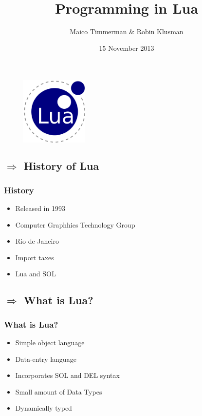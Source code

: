 \documentclass{beamer}
\begin{document}
\title{Programming in Lua}
\author{Maico Timmerman \& Robin Klusman}
\date{15 November 2013}

\begin{frame}
    \begin{figure}
        \includegraphics[width=0.3\textwidth]{lualogo}
        \vspace{-20pt}
    \end{figure}
    \maketitle
\end{frame}

\begin{frame}
    \section{$ \Rightarrow $ History of Lua}
    \frametitle{History}
    \begin{itemize}
        \item{Released in 1993}
        \item{Computer Graphhics Technology Group}
        \item{Rio de Janeiro}
        \item{Import taxes}
        \item{Lua and SOL}
    \end{itemize}	
\end{frame}

\begin{frame}
    \section{$ \Rightarrow $ What is Lua?}
    \frametitle{What is Lua?}
    \begin{itemize}
        \item{Simple object language}
        \item{Data-entry language}
        \item{Incorporates SOL and DEL syntax}
        \item{Small amount of Data Types}
        \item{Dynamically typed}
    \end{itemize}
\end{frame}
\end{document}
